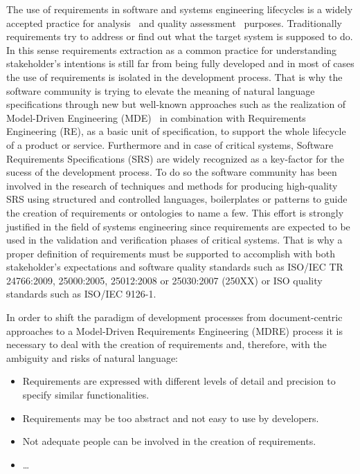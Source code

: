 The use of requirements in software and systems engineering lifecycles is a widely accepted practice for analysis~\cite{Sommerville:1998:REP:552009} and 
quality assessment~\cite{4685703} purposes. Traditionally requirements try to address or find out what the 
target system is supposed to do. In this sense requirements extraction as a common practice for understanding stakeholder’s 
intentions is still far from being fully developed and in most of cases the use of requirements is isolated 
in the development process. That is why the software community is trying to elevate the meaning of 
natural language specifications through new but well-known approaches such as the realization of 
Model-Driven Engineering (MDE)~\cite{DBLP:conf/gttse/Bezivin06,DBLP:conf/jisbd/Bezivin09} in combination 
with Requirements Engineering (RE), as a basic unit of specification, to support the whole lifecycle of a product or service. Furthermore and 
in case of critical systems, Software Requirements Specifications (SRS) are widely recognized as  
a key-factor for the sucess of the development process. To do so the software community has been 
involved in the research of techniques and methods for producing high-quality SRS using 
structured and controlled languages, boilerplates or patterns to guide the creation of requirements or 
ontologies to name a few. This effort is strongly justified in the field of systems engineering since 
requirements are expected to be used in the validation and verification phases of critical systems. That is 
why a proper definition of requirements must be supported to accomplish with both stakeholder's expectations and 
software quality standards such as ISO/IEC TR 24766:2009, 25000:2005, 25012:2008 or 25030:2007 (250XX) or ISO quality standards 
such as ISO/IEC 9126-1. 

In order to shift the paradigm of development processes from document-centric approaches to a 
Model-Driven Requirements Engineering (MDRE) process it is necessary to deal with the creation of requirements and, therefore, 
with the ambiguity and risks of natural language: 
\begin{itemize}
 \item Requirements are expressed with different levels of detail and precision to specify similar functionalities.
 \item Requirements may be too abstract and not easy to use by developers.
 \item Not adequate people can be involved in the creation of requirements.
 \item \ldots
\end{itemize}

